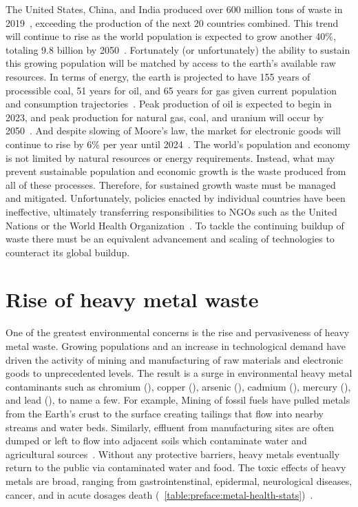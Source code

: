 \documentclass[../main/main]{subfiles}
\begin{document}
The United States, China, and India produced over 600 million tons of waste in 2019~\cite{theworldbank2018}, exceeding the production of the next 20 countries combined. This trend will continue to rise as the world population is expected to grow another 40\%, totaling 9.8 billion by 2050~\cite{unitednations2017}. Fortunately (or unfortunately) the ability to sustain this growing population will be matched by access to the earth's available raw resources. In terms of energy, the earth is projected to have 155 years of processible coal, 51 years for oil, and 65 years for gas given current population and consumption trajectories~\cite{shafiee2008,worldcoalassociation2015}.
Peak production of oil is expected to begin in 2023, and peak production for natural gas, coal, and uranium will occur by 2050~\cite{mason2007}. And despite slowing of Moore's law, the market for electronic goods will continue to rise by 6\% per year until 2024~\cite{robinson2009,hong2015,zionmarket2018}. The world's population and economy is not limited by natural resources or energy requirements. Instead, what may prevent sustainable population and economic growth is the waste produced from all of these processes. Therefore, for sustained growth waste must be managed and mitigated. Unfortunately, policies enacted by individual countries have been ineffective, ultimately transferring responsibilities to NGOs such as the United Nations or the World Health Organization~\cite{elliott2013}. To tackle the continuing buildup of waste there must be an equivalent advancement and scaling of technologies to counteract its global buildup.

\section{Rise of heavy metal waste}
\label{preface:rise-of-heavy-metal-waste}
One of the greatest environmental concerns is the rise and pervasiveness of heavy metal waste. Growing populations and an increase in technological demand have driven the activity of mining and manufacturing of raw materials and electronic goods to unprecedented levels. The result is a surge in environmental heavy metal contaminants such as chromium (), copper (), arsenic (), cadmium (), mercury (), and lead (), to name a few. For example, Mining of fossil fuels have pulled metals from the Earth's crust to the surface creating tailings that flow into nearby streams and water beds. Similarly, effluent from manufacturing sites are often dumped or left to flow into adjacent soils which contaminate water and agricultural sources~\cite{rattan2005}.
Without any protective barriers, heavy metals eventually return to the public via contaminated water and food. The toxic effects of heavy metals are broad, ranging from gastrointenstinal, epidermal, neurological diseases, cancer, and in acute dosages death (\TABLE~\ref{table:preface:metal-health-stats})~\cite{singh2011}.
\end{document}
